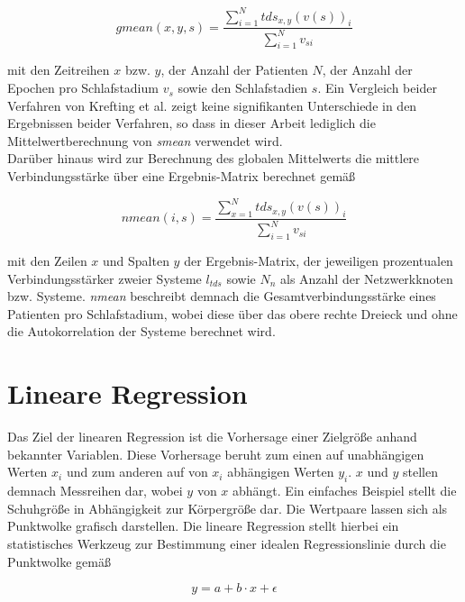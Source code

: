 \begin{equation}
gmean(x,y,s) = \frac{\sum \limits_{i=1}^N tds_{x,y}(v(s))_i}{\sum \limits_{i=1}^N v_{si}}
	\label{eq:gmean}
\end{equation}

mit den Zeitreihen $x$ bzw. $y$, der Anzahl der Patienten $N$, der Anzahl der Epochen pro Schlafstadium $v_s$ sowie den Schlafstadien $s$. Ein Vergleich beider Verfahren von Krefting et al. zeigt keine signifikanten Unterschiede in den Ergebnissen beider Verfahren, so dass in dieser Arbeit lediglich die Mittelwertberechnung von \textit{smean} verwendet wird. \parencite{bashan_network_2012, krefting_age_2017}\\

Darüber hinaus wird zur Berechnung des globalen Mittelwerts die mittlere Verbindungsstärke über eine Ergebnis-Matrix berechnet gemäß

\begin{equation}
nmean(i,s) = \frac{\sum \limits_{x=1}^N tds_{x,y}(v(s))_i}{\sum \limits_{i=1}^N v_{si}}
	\label{eq:nmean}
\end{equation}

mit den Zeilen $x$ und Spalten $y$ der Ergebnis-Matrix, der jeweiligen prozentualen Verbindungsstärker zweier Systeme $l_{tds}$ sowie $N_n$ als Anzahl der Netzwerkknoten bzw. Systeme. \textit{nmean} beschreibt demnach die Gesamtverbindungsstärke eines Patienten pro Schlafstadium, wobei diese über das obere rechte Dreieck und ohne die Autokorrelation der Systeme berechnet wird. \parencite{krefting_age_2017}

\section{Lineare Regression}

Das Ziel der linearen Regression ist die Vorhersage einer Zielgröße anhand bekannter Variablen. Diese Vorhersage beruht zum einen auf unabhängigen Werten $x_i$ und zum anderen auf von $x_i$ abhängigen Werten $y_i$. $x$ und $y$ stellen demnach Messreihen dar, wobei $y$ von $x$ abhängt. Ein einfaches Beispiel stellt die Schuhgröße in Abhängigkeit zur Körpergröße dar. Die Wertpaare lassen sich als Punktwolke grafisch darstellen. Die lineare Regression stellt hierbei ein statistisches Werkzeug zur Bestimmung einer idealen Regressionslinie durch die Punktwolke gemäß

\begin{equation}
y = a + b \cdot x + \epsilon
	\label{eq:linreg}
\end{equation}


